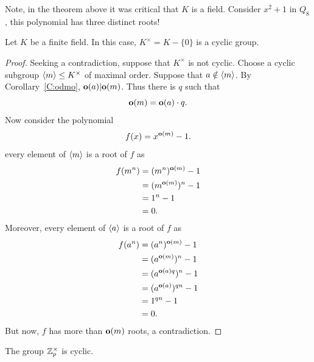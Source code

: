 \documentclass{ximera}
\begin{document}
\begin{remark}
  Note, in the theorem above it was critical that $K$ is a
  field. Consider $x^2+1$ in $Q_8$, this polynomial has three
  distinct roots!
\end{remark}



\begin{theorem}\label{T:mgc}
  Let $K$ be a finite field. In this case, $K^\times = K-\{0\}$ is a
  cyclic group.
  \begin{proof}
    Seeking a contradiction, suppose that $K^\times$ is not
    cyclic. Choose a cyclic subgroup $\langle m\rangle \leq K^\times$ of
    maximal order. Suppose that $a\notin\langle m\rangle$. By
    Corollary~\ref{C:odmo}, $\mathbf o(a)|\mathbf o(m)$. Thus there is $q$ such that
    \[
    \mathbf o(m) = \mathbf o(a)\cdot q.
    \]
    Now consider the polynomial
    \[
    f(x) = x^{\mathbf o(m)}-1.
    \]
    every element of $\langle m\rangle$ is a root of $f$ as
    \begin{align*}
    f(m^n) &=  (m^n)^{\mathbf o(m)} - 1\\
    &= (m^{\mathbf o(m)})^n-1\\
    &= 1^n-1\\
    &=0.
    \end{align*}
    Moreover, every element of $\langle a\rangle$ is a root of $f$ as
    \begin{align*}
    f(a^n) &=  (a^n)^{\mathbf o(m)} - 1\\
    &= (a^{\mathbf o(m)})^n-1\\
    &= (a^{\mathbf o(a)q})^n-1\\
    &= (a^{\mathbf o(a)})^{qn}-1\\
    &= 1^{qn}-1\\
    &=0.
    \end{align*}
    But now, $f$ has more than $\mathbf o(m)$ roots, a contradiction.
  \end{proof}
\end{theorem}

\begin{corollary}\label{C:mzpc}
  The group $\mathbb Z_p^\times$ is cyclic.
\end{corollary}
\end{document}
